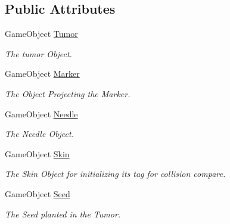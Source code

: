 \subsection*{Public Attributes}
\begin{DoxyCompactItemize}
\item 
\mbox{\label{class_needle_placement_a255e5f96de6f004c3c3949e32a0d788b}} 
Game\+Object \mbox{\hyperlink{class_needle_placement_a255e5f96de6f004c3c3949e32a0d788b}{Tumor}}
\begin{DoxyCompactList}\small\item\em The tumor Object. \end{DoxyCompactList}\item 
\mbox{\label{class_needle_placement_a7d40ce86efce0861ec0692f40a108557}} 
Game\+Object \mbox{\hyperlink{class_needle_placement_a7d40ce86efce0861ec0692f40a108557}{Marker}}
\begin{DoxyCompactList}\small\item\em The Object Projecting the Marker. \end{DoxyCompactList}\item 
\mbox{\label{class_needle_placement_a67cfbeeffd6a697da4e85b01c0d8f6d4}} 
Game\+Object \mbox{\hyperlink{class_needle_placement_a67cfbeeffd6a697da4e85b01c0d8f6d4}{Needle}}
\begin{DoxyCompactList}\small\item\em The Needle Object. \end{DoxyCompactList}\item 
\mbox{\label{class_needle_placement_a9c357a53dd68e7546b8fdd0fd7a3266c}} 
Game\+Object \mbox{\hyperlink{class_needle_placement_a9c357a53dd68e7546b8fdd0fd7a3266c}{Skin}}
\begin{DoxyCompactList}\small\item\em The Skin Object for initializing its tag for collision compare. \end{DoxyCompactList}\item 
\mbox{\label{class_needle_placement_a3f894880c0984ed43968bacf4f4dc9b4}} 
Game\+Object \mbox{\hyperlink{class_needle_placement_a3f894880c0984ed43968bacf4f4dc9b4}{Seed}}
\begin{DoxyCompactList}\small\item\em The Seed planted in the Tumor. \end{DoxyCompactList}\item 

\end{DoxyCompactItemize}
